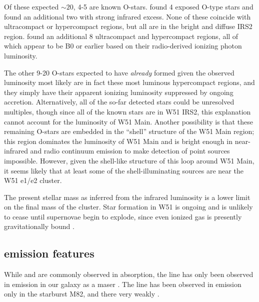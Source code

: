 Of these expected $\sim20$, 4-5 are known O-stars.  \citet{Figueredo2008a} found
4 exposed O-type stars and \citet{Barbosa2008a} found an additional two with
strong infrared excess.  None of these coincide with ultracompact or
hypercompact \hii regions, but all are in the bright and diffuse IRS2 region.
\citet{Mehringer1994a} found an additional 8 ultracompact and hypercompact \hii
regions, all of which appear to be B0 or earlier based on their radio-derived
ionizing photon luminosity.

The other 9-20 O-stars expected to have \emph{already} formed given the observed
luminosity most likely are in fact these most luminous hypercompact \hii regions,
and they simply have their apparent ionizing luminosity suppressed by ongoing
accretion.  Alternatively, all of the so-far detected stars could be unresolved
multiples, though since all of the known stars are in W51 IRS2, this
explanation cannot account for the luminosity of W51 Main.  Another possibility
is that these remaining O-stars are embedded in the ``shell'' structure of the
W51 Main region; this region dominates the luminosity of W51 Main and is bright
enough in near-infrared and radio continuum emission to make detection of point
sources impossible.  However, given the shell-like structure of this loop around
W51 Main, it seems likely that at least some of the shell-illuminating sources
are near the W51 e1/e2 cluster.

The present stellar mass as inferred from the infrared luminosity is a lower
limit on the final mass of the cluster.  Star formation in W51 is ongoing and
is unlikely to cease until supernovae begin to explode, since even ionized gas
is presently gravitationally bound
\citep{Ginsburg2012a,Bressert2012a,Ginsburg2015a}.



\subsection{\formaldehyde emission features}
While \formaldehyde \oneone and \twotwo are commonly observed in absorption,
the \oneone line has only been observed in emission in our galaxy as a maser
\citep{Araya2007b}.  The \twotwo line has been observed in emission only  in the
starburst M82, and there very weakly \citep{Mangum2008a}.

